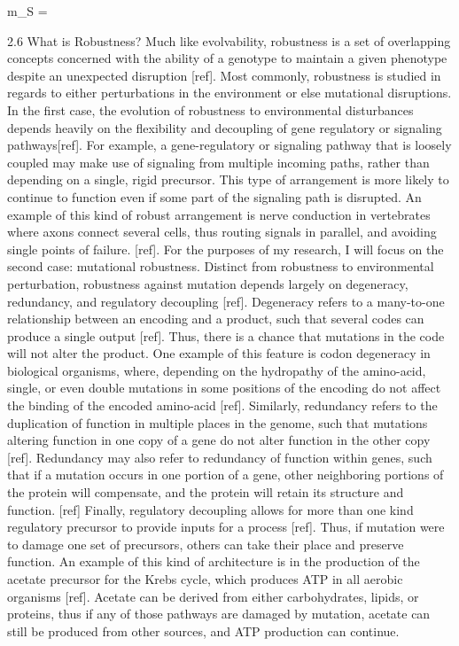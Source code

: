 m_{S} =   


2.6 What is Robustness? 
Much like evolvability, robustness is a set of overlapping concepts concerned with the ability of a genotype to maintain a given phenotype despite an unexpected disruption [ref].  Most commonly, robustness is studied in regards to either perturbations in the environment or else mutational disruptions. In the first case, the evolution of robustness to environmental disturbances depends heavily on the flexibility and decoupling of gene regulatory or signaling pathways[ref]. For example, a gene-regulatory or signaling pathway that is loosely coupled may make use of signaling from multiple incoming paths, rather than depending on a single, rigid precursor. This type of arrangement is more likely to continue to function even if some part of the signaling path is disrupted. An example of this kind of robust arrangement is nerve conduction in vertebrates where axons connect several cells, thus routing signals in parallel, and avoiding single points of failure. [ref].
For the purposes of my research, I will focus on the second case: mutational robustness. Distinct from robustness to environmental perturbation, robustness against mutation depends largely on degeneracy, redundancy, and regulatory decoupling [ref]. Degeneracy refers to a many-to-one relationship between an encoding and a product, such that several codes can produce a single output [ref]. Thus, there is a chance that mutations in the code will not alter the product. One example of this feature is codon degeneracy in biological organisms, where, depending on the hydropathy of the amino-acid, single, or even double mutations in some positions of the encoding do not affect the binding of the encoded amino-acid [ref].
Similarly, redundancy refers to the duplication of function in multiple places in the genome, such that mutations altering function in one copy of a gene do not alter function in the other copy [ref]. Redundancy may also refer to redundancy of function within genes, such that if a mutation occurs in one portion of a gene, other neighboring portions of the protein will compensate, and the protein will retain its structure and function. [ref]
Finally, regulatory decoupling allows for more than one kind regulatory precursor to provide inputs for a process [ref]. Thus, if mutation were to damage one set of precursors, others can take their place and preserve function. An example of this kind of architecture is in the production of the acetate precursor for the Krebs cycle, which produces ATP in all aerobic organisms [ref]. Acetate can be derived from either carbohydrates, lipids, or proteins, thus if any of those pathways are damaged by mutation, acetate can still be produced from other sources, and ATP production can continue.
